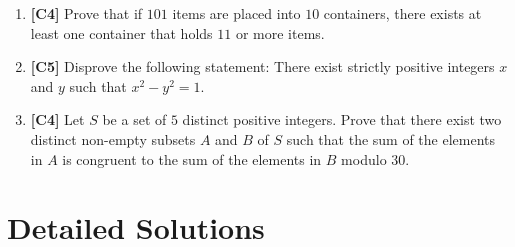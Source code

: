 \documentclass[11pt]{article}
\begin{document}
\begin{enumerate}
    \item \textbf{[C4]} Prove that if $101$ items are placed into $10$ containers, there exists at least one container that holds $11$ or more items.
    \item \textbf{[C5]} Disprove the following statement: There exist strictly positive integers $x$ and $y$ such that $x^2 - y^2 = 1$.
    \item \textbf{[C4]} Let $S$ be a set of $5$ distinct positive integers. Prove that there exist two distinct non-empty subsets $A$ and $B$ of $S$ such that the sum of the elements in $A$ is congruent to the sum of the elements in $B$ modulo $30$.
\end{enumerate}

\clearpage

\section{Detailed Solutions}
\end{document}
